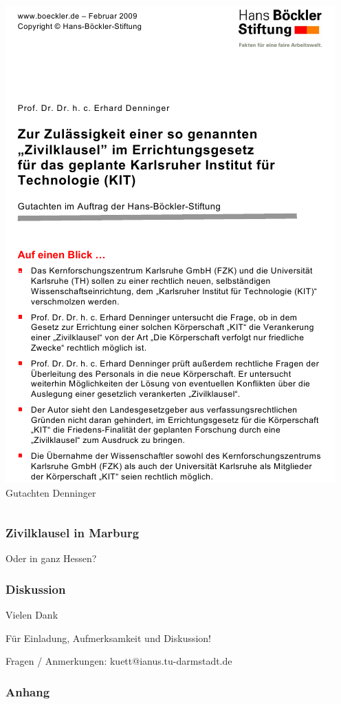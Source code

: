 \documentclass[presentation]{beamer}
\begin{document}
\begin{frame}
\begin{columns}[t]
\begin{column}{0.25\textwidth}
\includegraphics[width=\textwidth]{./denninger.png}
\newline
\tiny Gutachten Denninger
\end{column}
\end{columns}
\end{frame}
\begin{frame}
\frametitle{Zivilklausel in Marburg}
\label{sec-5-2}

Oder in ganz Hessen?
\end{frame}
\begin{frame}
\frametitle{Diskussion}
\label{sec-5-3}
\begin{block}{Vielen Dank}
\label{sec-5-3-1}

    Für Einladung, Aufmerksamkeit und Diskussion!
\end{block}
\label{sec-5-3-2}

    Fragen / Anmerkungen: kuett@ianus.tu-darmstadt.de
\end{frame}
\begin{frame}
\frametitle{Anhang}
\label{sec-5-4}

   \appendix
\end{frame}
\end{document}
